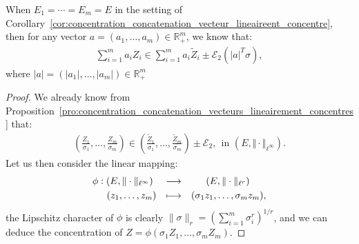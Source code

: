 \documentclass{ws-rmta}
\begin{document}
\begin{remark}\label{rem:concentration_concatenation_variable_lineairement_concentre}
  When $E_1=\cdots=E_m = E$ in the setting of Corollary~\ref{cor:concentration_concatenation_vecteur_lineaireent_concentre}, then for any vector $a=(a_1,\ldots,a_m)\in \mathbb R_+^m$, we know  that:
  \begin{align*}
    \sum_{i=1}^m a_i Z_i \in \sum_{i=1}^m a_i \tilde Z_i \pm \mathcal E_2(|a|^T\sigma),
  \end{align*}
  where $|a|=(|a_1|,\ldots,|a_m|)\in \mathbb R_+^m$
\end{remark}
\begin{proof}
  We already know from Proposition~\ref{pro:concentration_concatenation_vecteurs_lineairement_concentres} that:
  \begin{align*}
    \left(\frac{Z_1}{\sigma_1},\ldots,\frac{Z_m}{\sigma_m} \right) \in \left(\frac{\tilde Z_1}{\sigma_1},\ldots, \frac{\tilde Z_m}{\sigma_m}  \right) \pm \mathcal E_2,
     \ \ \text{in } (E, \Vert \cdot \Vert_{\ell^\infty}).
  \end{align*}
  Let us then consider the linear mapping:
  \begin{align*}
    \phi :
    \begin{aligned}[t]
      (E,\|\cdot \|_{\ell^\infty}) \ &
      &\longrightarrow&
      &(E,\|\cdot \|_{\ell^r})\hspace{0.6cm}\\
      (z_1,\ldots, z_m)&
      &\longmapsto&
      &(\sigma_1z_1,\ldots, \sigma_mz_m),
    \end{aligned}
  \end{align*}
  the Lipschitz character of $\phi$ is clearly $\|\sigma\|_r  = (\sum_{i=1}^m \sigma_i^r)^{1/r}$, and we can deduce the concentration of $Z = \phi(\sigma_1Z_1,\ldots, \sigma_m Z_m)$.  
\end{proof}
\end{document}
